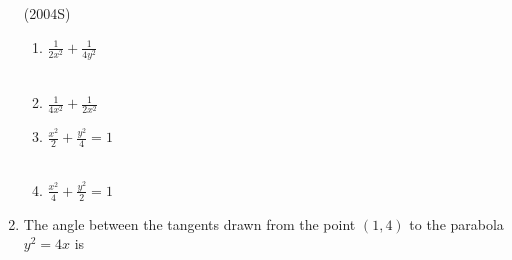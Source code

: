 \begin{enumerate}
\hfill{(2004S)}
\begin{multicols}{2}
\begin{enumerate}
    \item $\frac{1}{2x^{2}}+\frac{1}{4y^{2}}$ \\\\
    \item $\frac{1}{4x^{2}}+\frac{1}{2x^{2}}$ 
    \item $\frac{x^{2}}{2}+\frac{y^{2}}{4}=1$ \\\\
    \item $\frac{x^{2}}{4}+\frac{y^{2}}{2}=1$ 
\end{enumerate}
\end{multicols}
\item The angle between the tangents drawn from the point ${(1,4)}$ to the parabola $y^{2}=4x$ is 


\end{enumerate}
